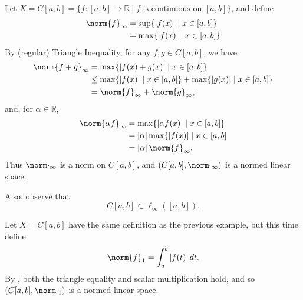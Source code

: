 \documentclass[notoc,notitlepage]{tufte-book}
\begin{document}
\begin{eg}
  Let $X = C[a, b] = \{ f : [a, b] \to \mathbb{R} \mid f \text{ is continuous on } [a, b] \}$, and define
  \begin{align*}
    \norm{f}_\infty &= \sup \{ \abs{f(x)} \mid x \in [a, b] \} \\
                    &= \max \{ \abs{f(x)} \mid x \in [a, b] \}
  \end{align*}
  By (regular) Triangle Inequality, for any $f, g \in C[a, b]$, we have
  \begin{align*}
    \norm{f + g}_\infty &= \max \{ \abs{ f(x) + g(x) } \mid x \in [a, b] \} \\
                        &\leq \max \{ \abs{f(x)} \mid x \in [a, b] \} + \max \{ \abs{g(x)} \mid x \in [a, b] \} \\
                        &= \norm{f}_\infty + \norm{g}_\infty,
  \end{align*}
  and, for $\alpha \in \mathbb{R}$,
  \begin{align*}
    \norm{\alpha f}_\infty &= \max \{ \abs{ \alpha f(x) } \mid x \in [a, b] \} \\
                           &= \abs{\alpha} \max \{ \abs{f(x)} \mid x \in [a, b] \\
                           &= \abs{\alpha} \norm{f}_\infty.
  \end{align*}
  Thus $\norm\cdot_\infty$ is a norm on $C[a, b]$, and $( C[a, b], \norm\cdot_\infty )$ is a normed linear space.

  Also, observe that
  \begin{equation*}
    C[a, b] \subset \ell_\infty( [a, b] ).
  \end{equation*}
\end{eg}

\begin{eg}
  Let $X = C[a, b]$  have the same definition as the previous example, but this time define
  \begin{equation*}
    \norm{f}_1 = \int_{a}^{b} \abs{f(t)} \dif{t}.
  \end{equation*}
  By , both the triangle equality and scalar multiplication hold, and so $(C[a, b], \norm\cdot_1)$ is a normed linear space.
\end{eg}
\end{document}
